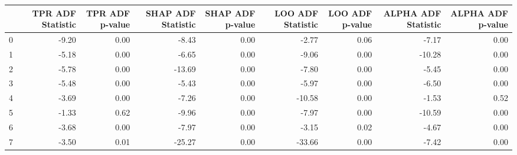 \begin{tabular}{lrrrrrrrr}
\toprule
 & TPR ADF Statistic & TPR ADF p-value & SHAP ADF Statistic & SHAP ADF p-value & LOO ADF Statistic & LOO ADF p-value & ALPHA ADF Statistic & ALPHA ADF p-value \\
\midrule
0 & -9.20 & 0.00 & -8.43 & 0.00 & -2.77 & 0.06 & -7.17 & 0.00 \\
1 & -5.18 & 0.00 & -6.65 & 0.00 & -9.06 & 0.00 & -10.28 & 0.00 \\
2 & -5.78 & 0.00 & -13.69 & 0.00 & -7.80 & 0.00 & -5.45 & 0.00 \\
3 & -5.48 & 0.00 & -5.43 & 0.00 & -5.97 & 0.00 & -6.50 & 0.00 \\
4 & -3.69 & 0.00 & -7.26 & 0.00 & -10.58 & 0.00 & -1.53 & 0.52 \\
5 & -1.33 & 0.62 & -9.96 & 0.00 & -7.97 & 0.00 & -10.59 & 0.00 \\
6 & -3.68 & 0.00 & -7.97 & 0.00 & -3.15 & 0.02 & -4.67 & 0.00 \\
7 & -3.50 & 0.01 & -25.27 & 0.00 & -33.66 & 0.00 & -7.42 & 0.00 \\
\bottomrule
\end{tabular}
